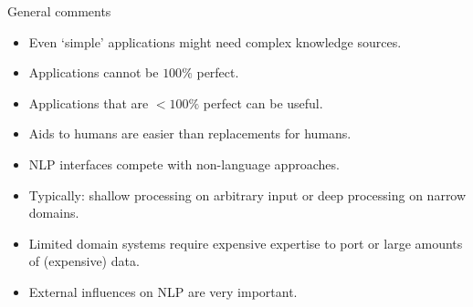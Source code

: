 \documentclass[compress]{beamer}
\begin{document}
\begin{frame}{General comments}
  \begin{itemize}
  \item Even `simple' applications might need complex knowledge
    sources.
  \item Applications cannot be $100\%$ perfect.
  \item Applications that are $< 100\%$ perfect can be useful.
  \item Aids to humans are easier than replacements for humans.
  \item NLP interfaces compete with non-language approaches.
  \item Typically: shallow processing on arbitrary input or deep
    processing on narrow domains.
  \item Limited domain systems require expensive expertise to port or
    large amounts of (expensive) data.
  \item External influences on NLP are very important.
  \end{itemize}
\end{frame}
\end{document}
